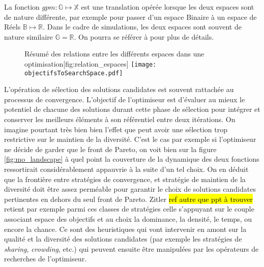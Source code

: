 La fonction $gpm : \mathbb{G} \mapsto \mathbb{X}$ est une translation opérée lorsque les deux espaces sont de nature différente, par exemple pour passer d'un espace Binaire à un espace de Réels $\mathbb{B} \mapsto \mathbb{R}$. Dans le cadre de simulations, les deux espaces sont souvent de nature similaire $\mathbb{G} = \mathbb{R}$. On pourra se référer à \textcite[86-88]{Weise2011} pour plus de détails.

\begin{figure}[!htbp]
	\begin{sidecaption}[fortoc]{Résumé des relations entre les différents espaces dans une optimisation}[fig:relation_espaces]
		\centering
		\texttt{[image: objectifsToSearchSpace.pdf]}
  \end{sidecaption}
\end{figure}


L'opération de sélection des solutions candidates est souvent rattachée au processus de convergence. L'objectif de l'optimiseur est d'évaluer au mieux le potentiel de chacune des solutions durant cette phase de sélection pour intégrer et conserver les meilleurs éléments à son référentiel entre deux itérations. On imagine pourtant très bien bien l'effet que peut avoir une sélection trop restrictive sur le maintien de la diversité. C'est le cas par exemple si l'optimiseur ne décide de garder que le front de Pareto, on voit bien sur la figure \ref{fig:mo_landscape} à quel point la couverture de la dynamique des deux fonctions ressortirait considérablement appauvrie à la suite d'un tel choix. On en déduit que la frontière entre stratégies de convergence, et stratégie de maintien de la diversité doit être assez perméable pour garantir le choix de solutions candidates pertinentes en dehors du seul front de Pareto. Zitler \hl{ref autre que ppt à trouver} retient par exemple parmi ces classes de stratégies celle s'appuyant sur le couple associant espace des objectifs et au choix la dominance, la densité, le temps, ou encore la chance. Ce sont des heuristiques qui vont intervenir en amont sur la qualité et la diversité des solutions candidates (par exemple les stratégies de \textit{sharing}, \textit{crowding}, etc.) qui peuvent ensuite être manipulées par les opérateurs de recherches de l'optimiseur.

